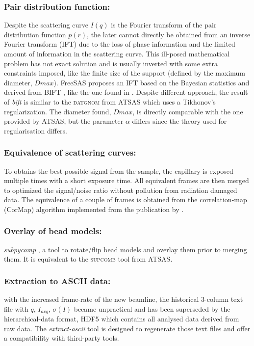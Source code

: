 \documentclass[preprint]{iucr}              %
\begin{document}
\subsubsection{Pair distribution function:}
Despite the scattering curve $I(q)$ is the Fourier transform of the pair distribution function $p(r)$, the later cannot directly be obtained from an inverse Fourier transform (IFT) due to the loss of phase information and the limited amount of information in the scattering curve. 
This ill-posed mathematical problem has not exact solution and is usually inverted with some extra constraints imposed, like the finite size of the support (defined by the maximum diameter, $Dmax$).    
FreeSAS proposes an IFT based on the Bayesian statistics and derived from BIFT \cite{bift}, like the one found in .
Despite different approach, the result of \textit{bift} is similar to the \textsc{datgnom} \cite{ATSAS1} from ATSAS which uses a Tikhonov's regularization.
The diameter found, $Dmax$, is directly comparable with the one provided by ATSAS, but the parameter $\alpha$ differs since the theory used for regularisation differs. 

\subsubsection{Equivalence of scattering curves: }
To obtains the best possible signal from the sample, the capillary is exposed multiple times with a short exposure time.
All equivalent frames are then merged to optimized the signal/noise ratio without pollution from radiation damaged data.  
The equivalence of a couple of frames is obtained from the correlation-map (CorMap) algorithm implemented from the publication by .

\subsubsection{Overlay of bead models:}
\textit{subpycomp} \cite{BM29ODA}, a tool to rotate/flip bead models and overlay them prior to merging them. It is equivalent to the \textsc{supcomb} \cite{supcomb} tool from ATSAS. 

\subsubsection{Extraction to ASCII data:} with the increased frame-rate of the new beamline, the historical 3-column text file with $q$, $I_{avg}$, $\sigma(I)$ became unpractical and has been superseded by the hierarchical-data format, HDF5 \cite{hdf5} which contains all analysed data derived from raw data.
The \textit{extract-ascii} tool is designed to regenerate those text files and offer a compatibility with third-party tools.
\end{document}
